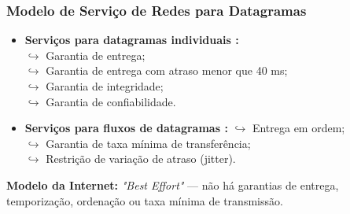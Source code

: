 \begin{itemize}[left=0.5cm, align=left, nosep]
\begin{enumerate}[left=0.5cm, align=left, nosep]
                \end{enumerate}

            \end{itemize}

        \subsubsection*{Modelo de Serviço de Redes para Datagramas}
            \begin{itemize}[left=0.5cm, align=left, nosep]
                \item \textbf{Serviços para datagramas individuais :} \\
                    $\hookrightarrow$ Garantia de entrega; \\
                    $\hookrightarrow$ Garantia de entrega com atraso menor que 40 ms; \\
                    $\hookrightarrow$ Garantia de integridade; \\
                    $\hookrightarrow$ Garantia de confiabilidade.
                \item \textbf{Serviços para fluxos de datagramas :}
                    $\hookrightarrow$ Entrega em ordem; \\
                    $\hookrightarrow$ Garantia de taxa mínima de transferência; \\
                    $\hookrightarrow$ Restrição de variação de atraso (jitter).
            \end{itemize}

        \textbf{Modelo da Internet:} \textit{"Best Effort"} — não há garantias de entrega, temporização, ordenação ou taxa mínima de transmissão.

